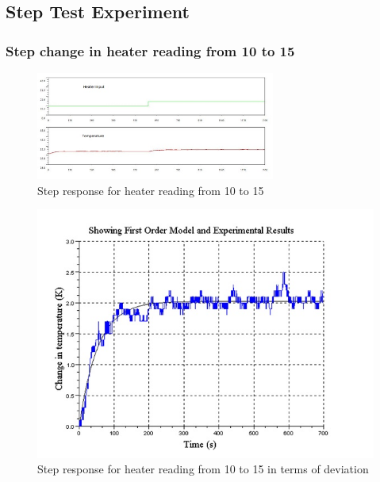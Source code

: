 \subsection{Step Test Experiment}
\subsubsection{Step change in heater reading from 10 to 15}

	
\begin{figure}
\centering	\includegraphics[width=0.7\textwidth]{Vikas_self/report_tex/parameter_estimation/10to15.jpg}
	\caption{Step response for heater reading from 10 to 15}
	\label{fig:10to15}
\end{figure}

	
	
\begin{figure}[h]
\centering
	\includegraphics[width = .75\textwidth]{Vikas_self/report_tex/parameter_estimation/optimized10to15.jpg}
		\caption{Step response for heater reading from 10 to 15 in terms of deviation}
	\label{optimized10to15}
\end{figure}

\newpage
